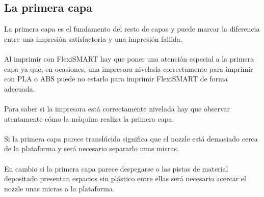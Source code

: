\documentclass[11pt,a4paper]{article}
\begin{document}
	\subsection{La primera capa}
La primera capa es el fundamento del resto de capas y puede marcar la diferencia entre una impresión satisfactoria y una impresión fallida.
\\\\
Al imprimir con FlexiSMART hay que poner una atención especial a la primera capa ya que, en ocasiones, una impresora nivelada correctamente para imprimir con PLA o ABS puede no estarlo para imprimir FlexiSMART de forma adecuada.
\\\\
Para saber si la impresora está correctamente nivelada hay que observar atentamente cómo la máquina realiza la primera capa.
\\\\
Si la primera capa parece translúcida significa que el nozzle está demasiado cerca de la plataforma y será necesario separarlo unas micras.
\\\\
En cambio si la primera capa parece despegarse o las pistas de material depositado presentan espacios sin plástico entre ellas será necesario acercar el nozzle unas micras a la plataforma.
\end{document}
